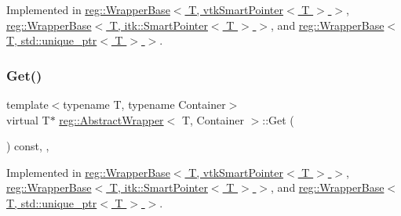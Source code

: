 Implemented in \hyperlink{structreg_1_1_wrapper_base_3_01_t_00_01vtk_smart_pointer_3_01_t_01_4_01_4_a3b2609bc1666d9f2dbfe789100889bdc}{reg\+::\+Wrapper\+Base$<$ T, vtk\+Smart\+Pointer$<$ T $>$ $>$}, \hyperlink{structreg_1_1_wrapper_base_3_01_t_00_01itk_1_1_smart_pointer_3_01_t_01_4_01_4_a10fb689e5da772970c04d312d600868d}{reg\+::\+Wrapper\+Base$<$ T, itk\+::\+Smart\+Pointer$<$ T $>$ $>$}, and \hyperlink{structreg_1_1_wrapper_base_3_01_t_00_01std_1_1unique__ptr_3_01_t_01_4_01_4_a1b7e67476da7973f319d68e65543d1be}{reg\+::\+Wrapper\+Base$<$ T, std\+::unique\+\_\+ptr$<$ T $>$ $>$}.

\mbox{\label{structreg_1_1_abstract_wrapper_a88e7079432573b09a5cd695be34e9147}} 
\subsubsection{\texorpdfstring{Get()}{Get()}}
{\footnotesize\ttfamily template$<$typename T, typename Container$>$ \\
virtual T$\ast$ \hyperlink{structreg_1_1_abstract_wrapper}{reg\+::\+Abstract\+Wrapper}$<$ T, Container $>$\+::Get (\begin{DoxyParamCaption}{ }\end{DoxyParamCaption}) const\hspace{0.3cm}{\ttfamily [protected]}, {}, {\ttfamily [noexcept]}}



Implemented in \hyperlink{structreg_1_1_wrapper_base_3_01_t_00_01vtk_smart_pointer_3_01_t_01_4_01_4_a61bd745924ef0582ee61ae174ed7479f}{reg\+::\+Wrapper\+Base$<$ T, vtk\+Smart\+Pointer$<$ T $>$ $>$}, \hyperlink{structreg_1_1_wrapper_base_3_01_t_00_01itk_1_1_smart_pointer_3_01_t_01_4_01_4_ac2d57c43556c87aa45dcafd2c8a9cb47}{reg\+::\+Wrapper\+Base$<$ T, itk\+::\+Smart\+Pointer$<$ T $>$ $>$}, and \hyperlink{structreg_1_1_wrapper_base_3_01_t_00_01std_1_1unique__ptr_3_01_t_01_4_01_4_a9f4701d60f0dee6b61ae4046633f3ebe}{reg\+::\+Wrapper\+Base$<$ T, std\+::unique\+\_\+ptr$<$ T $>$ $>$}.

\mbox{\label{structreg_1_1_abstract_wrapper_af017f2af039fd5b940345e930e4bb397}} 
